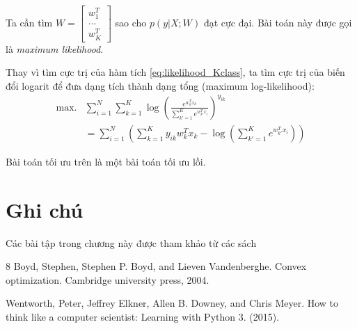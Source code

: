 \documentclass{book}
\newcounter{savedenum}
\newcommand*{\saveenum}{\setcounter{savedenum}{\theenumi}}
\newcommand*{\resume}{\setcounter{enumi}{\thesavedenum}}
\begin{document}
Ta cần tìm  $W = \begin{bmatrix}
w_1^T \\ ... \\ w_K^T
\end{bmatrix}$ sao cho $p(y| X; W)$ đạt cực đại. Bài toán này được gọi là \emph{maximum likelihood}.

Thay vì tìm cực trị của hàm tích \eqref{eq:likelihood_Kclass}, ta tìm cực trị của biến đổi logarit để đưa dạng tích thành dạng tổng (maximum log-likelihood):
\begin{align}
\mathrm{max.} & \sum_{i=1}^N \sum_{k=1}^K \log\left( \frac{e^{w_k^T x_k}}{\sum_{k'=1}^K e^{w_{k'}^T x_i}}\right)^{y_{ik}}\\
			& =\sum_{i=1}^N \left( \sum_{k=1}^K y_{ik}w_k^T x_k - \log(\sum_{k'=1}^K e^{w_{k'}^T x_i}) \right)
\label{eq:mllikelihood_Kclass}
\end{align}

Bài toán tối ưu trên là một bài toán tối ưu lồi.









%
%
%


\section{Ghi chú}
Các bài tập trong chương này được tham khảo từ các sách \cite{boyd}

\begin{thebibliography}{8}
Boyd, Stephen, Stephen P. Boyd, and Lieven Vandenberghe. Convex optimization. Cambridge university press, 2004.

Wentworth, Peter, Jeffrey Elkner, Allen B. Downey, and Chris Meyer. How to think like a computer scientist: Learning with Python 3. (2015).

\end{thebibliography}
\end{document}
